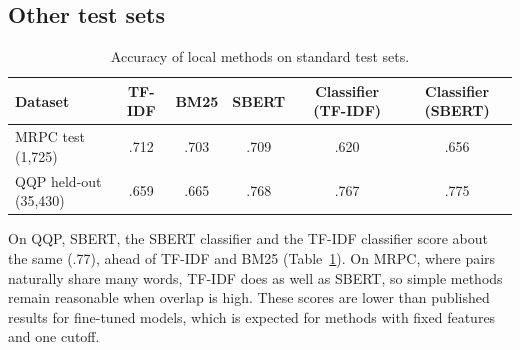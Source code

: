 \documentclass[11pt]{article}
\begin{document}
\subsection{Other test sets}
\begin{table}[t]
\centering\small
\begin{tabular}{@{}lccccc@{}}
\toprule
\textbf{Dataset} & \textbf{TF-IDF} & \textbf{BM25} & \textbf{SBERT} & \textbf{Classifier (TF-IDF)} & \textbf{Classifier (SBERT)} \\
\midrule
MRPC test (1,725) & .712 & .703 & .709 & .620 & .656 \\
QQP held-out (35,430) & .659 & .665 & .768 & .767 & .775 \\
\bottomrule
\end{tabular}
\caption{Accuracy of local methods on standard test sets.}
\label{tab:other}
\end{table}
On QQP, SBERT, the SBERT classifier and the TF-IDF classifier score about the same (.77), ahead of TF-IDF and BM25 (Table~\ref{tab:other}). On MRPC, where pairs naturally share many words, TF-IDF does as well as SBERT, so simple methods remain reasonable when overlap is high. These scores are lower than published results for fine-tuned models, which is expected for methods with fixed features and one cutoff.
\end{document}
